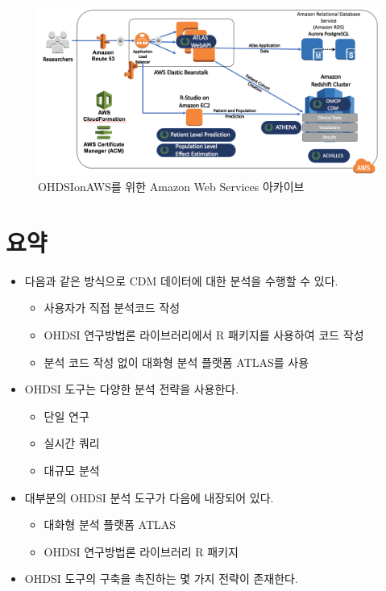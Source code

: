 \documentclass[10.5pt]{book}
\providecommand{\tightlist}{%
  \setlength{\itemsep}{0pt}\setlength{\parskip}{0pt}}
\theoremstyle{definition}
\theoremstyle{definition}
\theoremstyle{definition}
\theoremstyle{remark}
\let\BeginKnitrBlock\begin \let\EndKnitrBlock\end
\begin{document}
\begin{figure}

{\centering \includegraphics[width=1\linewidth]{images/OhdsiAnalyticsTools/OHDSIonAWSDiagram} 

}

\caption{OHDSIonAWS를 위한 Amazon Web Services 아카이브}\label{fig:ohdsionawsDiagram}
\end{figure}

\section{요약}\label{-6}

\BeginKnitrBlock{rmdsummary}
\begin{itemize}
\tightlist
\item
  다음과 같은 방식으로 CDM 데이터에 대한 분석을 수행할 수 있다.

  \begin{itemize}
  \tightlist
  \item
    사용자가 직접 분석코드 작성
  \item
    OHDSI 연구방법론 라이브러리에서 R 패키지를 사용하여 코드 작성
  \item
    분석 코드 작성 없이 대화형 분석 플랫폼 ATLAS를 사용
  \end{itemize}
\item
  OHDSI 도구는 다양한 분석 전략을 사용한다.

  \begin{itemize}
  \tightlist
  \item
    단일 연구
  \item
    실시간 쿼리
  \item
    대규모 분석
  \end{itemize}
\item
  대부분의 OHDSI 분석 도구가 다음에 내장되어 있다.

  \begin{itemize}
  \tightlist
  \item
    대화형 분석 플랫폼 ATLAS
  \item
    OHDSI 연구방법론 라이브러리 R 패키지
  \end{itemize}
\item
  OHDSI 도구의 구축을 촉진하는 몇 가지 전략이 존재한다.
\end{itemize}
\EndKnitrBlock{rmdsummary}
\end{document}
